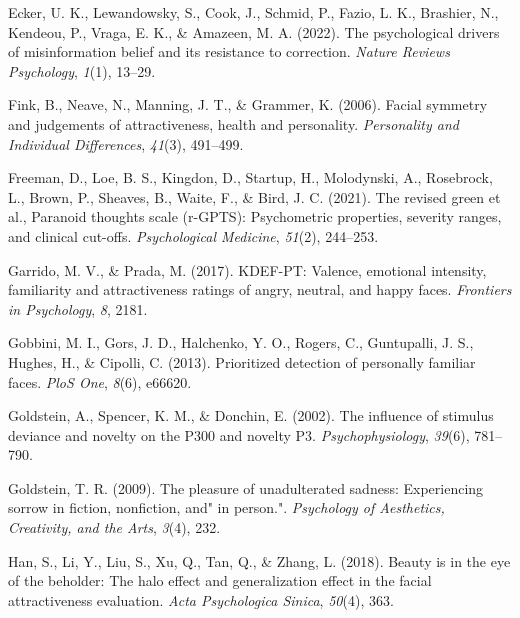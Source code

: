 \documentclass[
  man,floatsintext]{apa6}
\newlength{\cslhangindent}
\newlength{\cslentryspacingunit} %
\newenvironment{CSLReferences}[2] %
 {%
  \setlength{\parindent}{0pt}
  \ifodd #1
  \let\oldpar\par
  \def\par{\hangindent=\cslhangindent\oldpar}
  \fi
  \setlength{\parskip}{#2\cslentryspacingunit}
 }%
 {}
\begin{document}
\begin{CSLReferences}{1}{0}
\leavevmode{}%
Ecker, U. K., Lewandowsky, S., Cook, J., Schmid, P., Fazio, L. K., Brashier, N., Kendeou, P., Vraga, E. K., \& Amazeen, M. A. (2022). The psychological drivers of misinformation belief and its resistance to correction. \emph{Nature Reviews Psychology}, \emph{1}(1), 13--29.

\leavevmode{}%
Fink, B., Neave, N., Manning, J. T., \& Grammer, K. (2006). Facial symmetry and judgements of attractiveness, health and personality. \emph{Personality and Individual Differences}, \emph{41}(3), 491--499.

\leavevmode{}%
Freeman, D., Loe, B. S., Kingdon, D., Startup, H., Molodynski, A., Rosebrock, L., Brown, P., Sheaves, B., Waite, F., \& Bird, J. C. (2021). The revised green et al., Paranoid thoughts scale (r-GPTS): Psychometric properties, severity ranges, and clinical cut-offs. \emph{Psychological Medicine}, \emph{51}(2), 244--253.

\leavevmode{}%
Garrido, M. V., \& Prada, M. (2017). KDEF-PT: Valence, emotional intensity, familiarity and attractiveness ratings of angry, neutral, and happy faces. \emph{Frontiers in Psychology}, \emph{8}, 2181.

\leavevmode{}%
Gobbini, M. I., Gors, J. D., Halchenko, Y. O., Rogers, C., Guntupalli, J. S., Hughes, H., \& Cipolli, C. (2013). Prioritized detection of personally familiar faces. \emph{PloS One}, \emph{8}(6), e66620.

\leavevmode{}%
Goldstein, A., Spencer, K. M., \& Donchin, E. (2002). The influence of stimulus deviance and novelty on the P300 and novelty P3. \emph{Psychophysiology}, \emph{39}(6), 781--790.

\leavevmode{}%
Goldstein, T. R. (2009). The pleasure of unadulterated sadness: Experiencing sorrow in fiction, nonfiction, and" in person.". \emph{Psychology of Aesthetics, Creativity, and the Arts}, \emph{3}(4), 232.

\leavevmode{}%
Han, S., Li, Y., Liu, S., Xu, Q., Tan, Q., \& Zhang, L. (2018). Beauty is in the eye of the beholder: The halo effect and generalization effect in the facial attractiveness evaluation. \emph{Acta Psychologica Sinica}, \emph{50}(4), 363.


\end{CSLReferences}
\end{document}
